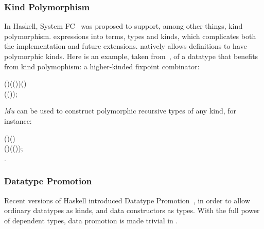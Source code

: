 \subsubsection{Kind Polymorphism}
In Haskell, System FC~\cite{fc:pro} was proposed to support, among
other things, kind polymorphism. 
expressions into terms, types and kinds, which complicates both the
implementation and future extensions. \sufcc natively allows 
definitions to have polymorphic kinds. Here is an example, taken
from~\cite{fc:pro}, of a datatype that benefits from kind polymophism:
a higher-kinded fixpoint combinator:
\begin{hscode}\SaveRestoreHook
{}%
%
%
%
\>[3]{}\;\;(\mathbin{:}\star)\;(\mathbin{:}(\to \star)\to {}\to \star)\;(\mathbin{:})\mathrel{=}{}\<[E]%
\\
\>[3]{}\<[5]%
\>[5]{}\;(\mathbin{:}\;(\;\;)\;);{}\<[E]%
\ColumnHook
\end{hscode}\resethooks
\emph{Mu} can be used to construct polymorphic recursive types of any kind, for instance:
\begin{hscode}\SaveRestoreHook
{}%
%
%
%
\>[3]{}\;\;(\mathbin{:}\star\to \star)\;(\mathbin{:}\star)\mathrel{=}\<[E]%
\\
\>[3]{}\<[5]%
\>[5]{}\mid {}\;(\mathbin{:})\;(\mathbin{:}(\;));{}\<[E]%
\\
\>[3]{}\;\mathbin{:}\star\to \star\mathrel{=}\lambda {}\mathbin{:}\star.\,\star{}\;\<[E]%
\ColumnHook
\end{hscode}\resethooks

\subsubsection{Datatype Promotion}
Recent versions of Haskell introduced Datatype Promotion~\cite{}, 
in order to allow ordinary datatypes as kinds, and data constructors
as types. With the full power of dependent types, data promotion is
made trivial in \sufcc.

